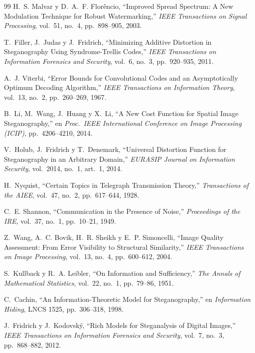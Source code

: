 \documentclass[12pt,a4paper]{article}
\begin{document}
\begin{thebibliography}{99}
H.~S. Malvar y D.~A.~F. Florêncio, ``Improved Spread Spectrum: A New Modulation
Technique for Robust Watermarking,'' \emph{IEEE Transactions on Signal
Processing}, vol.~51, no.~4, pp.~898--905, 2003.

T.~Filler, J.~Judas y J.~Fridrich, ``Minimizing Additive Distortion in
Steganography Using Syndrome-Trellis Codes,'' \emph{IEEE Transactions on
Information Forensics and Security}, vol.~6, no.~3, pp.~920--935, 2011.

A.~J. Viterbi, ``Error Bounds for Convolutional Codes and an Asymptotically
Optimum Decoding Algorithm,'' \emph{IEEE Transactions on Information Theory},
vol.~13, no.~2, pp.~260--269, 1967.

B.~Li, M.~Wang, J.~Huang y X.~Li, ``A New Cost Function for Spatial Image
Steganography,'' en \emph{Proc.\ IEEE International Conference on Image Processing
(ICIP)}, pp.~4206--4210, 2014.

V.~Holub, J.~Fridrich y T.~Denemark, ``Universal Distortion Function for
Steganography in an Arbitrary Domain,'' \emph{EURASIP Journal on Information
Security}, vol.~2014, no.~1, art.~1, 2014.

H.~Nyquist, ``Certain Topics in Telegraph Transmission Theory,''
\emph{Transactions of the AIEE}, vol.~47, no.~2, pp.~617--644, 1928.

C.~E. Shannon, ``Communication in the Presence of Noise,''
\emph{Proceedings of the IRE}, vol.~37, no.~1, pp.~10--21, 1949.

Z.~Wang, A.~C. Bovik, H.~R. Sheikh y E.~P. Simoncelli, ``Image Quality Assessment:
From Error Visibility to Structural Similarity,'' \emph{IEEE Transactions on Image
Processing}, vol.~13, no.~4, pp.~600--612, 2004.

S.~Kullback y R.~A. Leibler, ``On Information and Sufficiency,''
\emph{The Annals of Mathematical Statistics}, vol.~22, no.~1, pp.~79--86, 1951.

C.~Cachin, ``An Information-Theoretic Model for Steganography,'' en
\emph{Information Hiding}, LNCS 1525, pp.~306--318, 1998.

J.~Fridrich y J.~Kodovský, ``Rich Models for Steganalysis of Digital Images,''
\emph{IEEE Transactions on Information Forensics and Security}, vol.~7, no.~3,
pp.~868--882, 2012.


\end{thebibliography}
\end{document}
